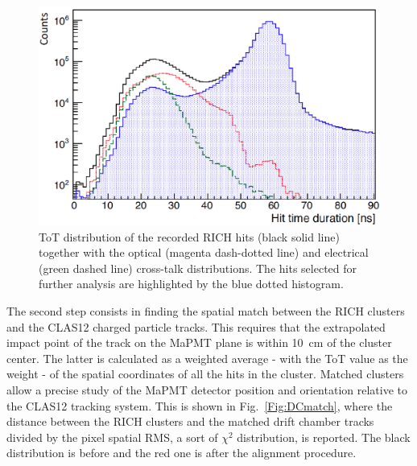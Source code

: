 \documentclass[5p,times,twocolumn]{elsarticle}
\def\MaPMT{MaPMT }
\begin{document}
\begin{figure}[t]
\begin{center}
\includegraphics[width=0.95\columnwidth]{xtalk2.png}
\end{center}
\caption{ToT distribution of the recorded RICH hits (black solid line) together with the optical (magenta dash-dotted line)
  and electrical (green dashed line) cross-talk distributions.  The hits selected for further analysis are highlighted by the
  blue dotted histogram. }
\label{Fig:Xtalk}
\end{figure}


The second step consists in finding the spatial match between the RICH clusters and the CLAS12 charged particle tracks. This requires
that the extrapolated impact point of the track on the MaPMT plane is within 10~cm of the cluster center. The latter
is calculated as a weighted average - with the ToT value as the weight - of the spatial coordinates of all the hits in the
cluster. Matched clusters allow a precise study of the MaPMT detector position and orientation relative to the CLAS12
tracking system. This is shown in Fig.~\ref{Fig:DCmatch}, where the distance between the RICH clusters and the matched 
drift chamber tracks~\cite{REF:dc-nim} divided by the pixel spatial RMS, a sort of $\chi^2$ distribution, is reported. The black
distribution is before and the red one is after the alignment procedure.
\end{document}
